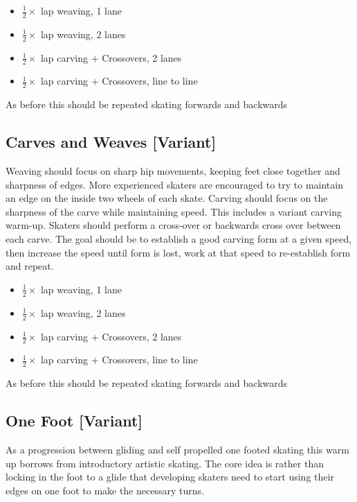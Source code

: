 \documentclass{journal}
\begin{document}
\begin{itemize}
    \item $\frac{1}{2}\times$ lap weaving, 1 lane 
    \item $\frac{1}{2}\times$ lap weaving, 2 lanes
    \item $\frac{1}{2}\times$ lap carving + Crossovers, 2 lanes 
    \item $\frac{1}{2}\times$ lap carving + Crossovers, line to line
\end{itemize}

As before this should be repeated skating forwards and backwards

\subsection*{Carves and Weaves [Variant]}
\label{drill:sticky:carves_and_weaves}
Weaving should focus on sharp hip movements, keeping feet close together and sharpness of edges. More experienced skaters are encouraged to try to maintain an edge on the inside two wheels of each skate.     
Carving should focus on the sharpness of the carve while maintaining speed.
This includes a variant carving warm-up. 
Skaters should perform a cross-over or backwards cross over between each carve.
The goal should be to establish a good carving form at a given speed, then increase the speed until form is lost, work at that speed to re-establish form and repeat.

\begin{itemize}
    \item $\frac{1}{2}\times$ lap weaving, 1 lane 
    \item $\frac{1}{2}\times$ lap weaving, 2 lanes
    \item $\frac{1}{2}\times$ lap carving + Crossovers, 2 lanes 
    \item $\frac{1}{2}\times$ lap carving + Crossovers, line to line
\end{itemize}

As before this should be repeated skating forwards and backwards



\subsection*{One Foot [Variant]}
\label{drill:one_foot:serpentine}
As a progression between gliding and self propelled one footed skating this warm up borrows from introductory artistic skating.
The core idea is rather than locking in the foot to a glide that developing skaters need to start using their edges on one foot to make the necessary turns.     
\end{document}

